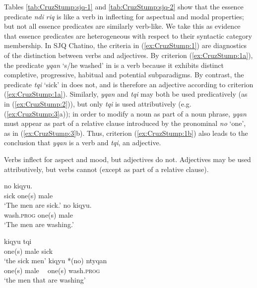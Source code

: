 \documentclass[output=paper]{langsci/langscibook}
\begin{document}
Tables \ref{tab:CruzStump:sjq-1} and \ref{tab:CruzStump:sjq-2} show that the essence predicate \emph{ndi} \emph{riq} is like a verb in inflecting for
aspectual and modal properties; but not all essence predicates are similarly verb-like. We take this
as evidence that essence predicates are heterogeneous with respect to their syntactic category
membership. 
In SJQ Chatino, the criteria in (\ref{ex:CruzStump:1}) are diagnostics of the distinction between verbs and adjectives. By
criterion (\ref{ex:CruzStump:1a}), the predicate \emph{yqan} `s/he washed' in  is a verb because it exhibits distinct
completive, progressive, habitual and potential subparadigms. By contrast, the predicate \emph{tqi} `sick'
in  does not, and is therefore an adjective according to criterion (\ref{ex:CruzStump:1a}). Similarly, \emph{yqan} and \emph{tqi} may both be used
predicatively (as in (\ref{ex:CruzStump:2})), but only \emph{tqi} is used attributively (e.g. (\ref{ex:CruzStump:3}a)); in order to modify a noun as
part of a noun phrase, \emph{yqan} must appear as part of a relative clause introduced by the pronominal \emph{no} `one', as
in (\ref{ex:CruzStump:3}b). Thus, criterion (\ref{ex:CruzStump:1b}) also leads to the conclusion that \emph{yqan} is a verb and \emph{tqi}, an adjective.

\ea \label{ex:CruzStump:1}
		\ea\label{ex:CruzStump:1a}	 Verbs inflect for aspect and mood, but adjectives do not.
		\ex\label{ex:CruzStump:1b} Adjectives may be used attributively, but verbs cannot (except as part of a relative clause).
		\z
\ex \label{ex:CruzStump:2} \begin{xlist}
\ex {} {no} {kiqyu}.\\
sick one(s) male\\
\trans `The men are sick.'
\ex{} {no} {kiqyu}.\\
		wash.\textsc{prog} one(s) male \\
\trans		`The men are washing.'
		\end{xlist}
\ex \label{ex:CruzStump:3} 
\begin{xlist}
\ex{} {kiqyu} {tqi}\\
          one(s) male sick\\
\trans `the sick men'
\ex{} {kiqyu} *({no})  {ntyqan}\\
     one(s) male  \textcolor{white}{*(}one(s) wash.\textsc{prog}\\
\trans `the men that are washing'
\end{xlist}
\z
\end{document}
